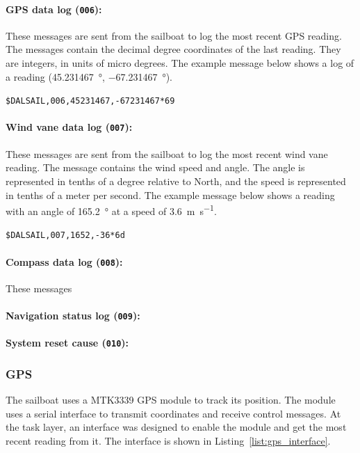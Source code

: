 \documentclass[12pt]{article}
\begin{document}
\paragraph{GPS data log (\texttt{006}):}
These messages are sent from the sailboat to log the most recent GPS reading. The messages contain the decimal degree coordinates of the last reading. They are integers, in units of micro degrees. The example message below shows a log of a reading (\SI{45.231467}{\degree}, \SI{-67.231467}{\degree}).
\begin{center}
	\texttt{\$DALSAIL,006,45231467,-67231467*69}
\end{center}

\paragraph{Wind vane data log (\texttt{007}):}
These messages are sent from the sailboat to log the most recent wind vane reading. The message contains the wind speed and angle. The angle is represented in tenths of a degree relative to North, and the speed is represented in tenths of a meter per second. The example message below shows a reading with an angle of \SI{165.2}{\degree} at a speed of \SI{3.6}{\meter\per\second}. 
\begin{center}
	\texttt{\$DALSAIL,007,1652,-36*6d}
\end{center}

\paragraph{Compass data log (\texttt{008}):}
These messages 
\paragraph{Navigation status log (\texttt{009}):}
\paragraph{System reset cause (\texttt{010}):}


\subsubsection{GPS}
The sailboat uses a MTK3339 GPS module to track its position. The module uses a serial interface to transmit coordinates and receive control messages. At the task layer, an interface was designed to enable the module and get the most recent reading from it. The interface is shown in Listing~\ref{list:gps_interface}.
\end{document}
